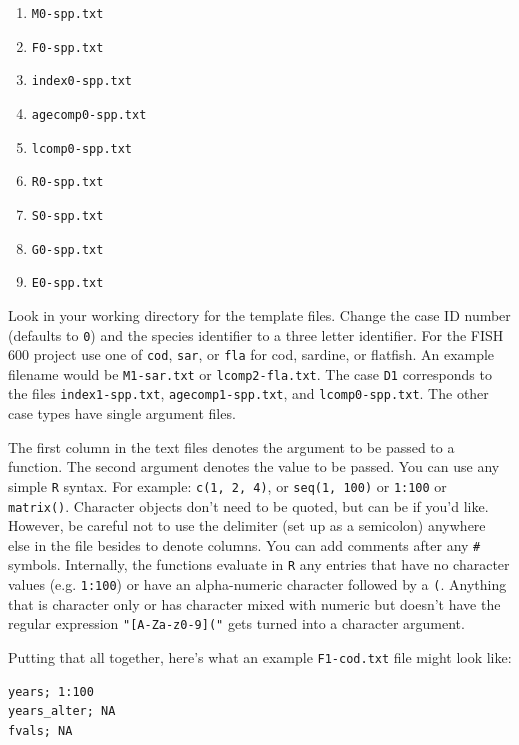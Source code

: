 \documentclass[12pt]{article}
\begin{document}
\begin{enumerate}
  \item \texttt{M0-spp.txt}
  \item \texttt{F0-spp.txt}
  \item \texttt{index0-spp.txt}
  \item \texttt{agecomp0-spp.txt}
  \item \texttt{lcomp0-spp.txt}
  \item \texttt{R0-spp.txt} 
  \item \texttt{S0-spp.txt} 
  \item \texttt{G0-spp.txt} 
  \item \texttt{E0-spp.txt} 
\end{enumerate}

Look in your working directory for the template files. Change the case ID 
number (defaults to \texttt{0}) and the species identifier to a three letter 
identifier. For the FISH 600 project use one of \texttt{cod}, \texttt{sar}, or 
\texttt{fla} for cod, sardine, or flatfish. An example filename would be 
\texttt{M1-sar.txt} or \texttt{lcomp2-fla.txt}. The case \texttt{D1} 
corresponds to the files \texttt{index1-spp.txt}, \texttt{agecomp1-spp.txt}, 
and \texttt{lcomp0-spp.txt}. The other case types have single argument files.

The first column in the text files denotes the argument to be passed to a 
function. The second argument denotes the value to be passed. You can use any 
simple \texttt{R} syntax. For example: \texttt{c(1, 2, 4)}, or \texttt{seq(1, 100)} or 
\texttt{1:100} or \texttt{matrix()}. Character objects don't need to be quoted, 
but can be if you'd like. However, be careful not to use the delimiter (set up 
as a semicolon) anywhere else in the file besides to denote columns. You can 
add comments after any \texttt{\#} symbols. Internally, the functions evaluate 
in \texttt{R} any entries that have no character values (e.g. \texttt{1:100}) or have an 
alpha-numeric character followed by a \texttt{(}. Anything that is character 
only or has character mixed with numeric but doesn't have the regular 
expression \texttt{"[A-Za-z0-9]("} gets turned into a character argument.

Putting that all together, here's what an example \texttt{F1-cod.txt} file 
might look like:

\begin{verbatim}
years; 1:100
years_alter; NA 
fvals; NA
\end{verbatim}
\end{document}
